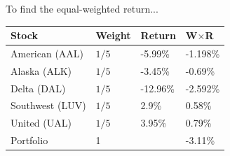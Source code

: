 To find the equal-weighted return...
\begin{center}
	{\color{blue}
	\begin{tabular}{l|lll}
		\textbf{Stock} & \textbf{W}eight & \textbf{R}eturn & \textbf{W}$\times$\textbf{R}\\ \hline
		American (AAL) & $1/5$ & -5.99\% & -1.198\% \\
		Alaska (ALK) & $1/5$ & -3.45\% & -0.69\% \\
		Delta (DAL) & $1/5$ & -12.96\% & -2.592\% \\
		Southwest (LUV) & $1/5$ & 2.9\% & 0.58\% \\
		United (UAL) & $1/5$ & 3.95\% & 0.79\% \\ \hline 
		Portfolio & 1 && -3.11\% \\\hline
	\end{tabular}
	}
\end{center}